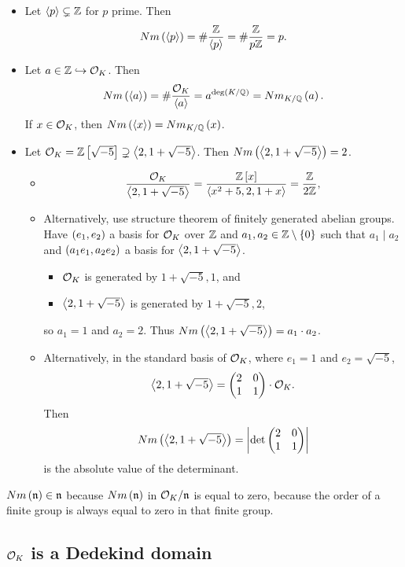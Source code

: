 \begin{example*}
\hfill
\begin{itemize}
\item Let $ \left\langle p \right\rangle \subsetneq \mathbb{Z} $ for $ p $ prime. Then
$$ Nm\left( \left\langle p \right\rangle \right) = \#\dfrac{\mathbb{Z}}{\left\langle p \right\rangle} = \#\dfrac{\mathbb{Z}}{p\mathbb{Z}} = p. $$
\item Let $ a \in \mathbb{Z} \hookrightarrow \mathcal{O}_K $. Then
$$ Nm\left( \left\langle a \right\rangle \right) = \#\dfrac{\mathcal{O}_K}{\left\langle a \right\rangle} = a^{\deg\left( K / \mathbb{Q} \right)} = Nm_{K / \mathbb{Q}}\left( a \right). $$
If $ x \in \mathcal{O}_K $, then $ Nm\left( \left\langle x \right\rangle \right) = Nm_{K / \mathbb{Q}}\left( x \right) $.
\item Let $ \mathcal{O}_K = \mathbb{Z}\left[ \sqrt{-5} \right] \supsetneq \left\langle 2, 1 + \sqrt{-5} \right\rangle $. Then $ Nm\left( \left\langle 2, 1 + \sqrt{-5} \right\rangle \right) = 2 $.
\begin{itemize}
\item
$$ \dfrac{\mathcal{O}_K}{\left\langle 2, 1 + \sqrt{-5} \right\rangle} = \dfrac{\mathbb{Z}\left[ x \right]}{\left\langle x^2 + 5, 2, 1 + x \right\rangle} = \dfrac{\mathbb{Z}}{2\mathbb{Z}}, $$
\item Alternatively, use structure theorem of finitely generated abelian groups. Have $ \left( e_1, e_2 \right) $ a basis for $ \mathcal{O}_K $ over $ \mathbb{Z} $ and $ a_1, a_2 \in \mathbb{Z} \setminus \left\{ 0 \right\} $ such that $ a_1 \mid a_2 $ and $ \left( a_1e_1, a_2e_2 \right) $ a basis for $ \left\langle 2, 1 + \sqrt{-5} \right\rangle $.
\begin{itemize}
\item $ \mathcal{O}_K $ is generated by $ 1 + \sqrt{-5}, 1 $, and
\item $ \left\langle 2, 1 + \sqrt{-5} \right\rangle $ is generated by $ 1 + \sqrt{-5}, 2 $,
\end{itemize}
so $ a_1 = 1 $ and $ a_2 = 2 $. Thus $ Nm\left( \left\langle 2, 1 + \sqrt{-5} \right\rangle \right) = a_1 \cdot a_2 $.
\item Alternatively, in the standard basis of $ \mathcal{O}_K $, where $ e_1 = 1 $ and $ e_2 = \sqrt{-5} $,
$$ \left\langle 2, 1 + \sqrt{-5} \right\rangle = \begin{pmatrix} 2 & 0 \\ 1 & 1 \end{pmatrix} \cdot \mathcal{O}_K. $$
Then
$$ Nm\left( \left\langle 2, 1 + \sqrt{-5} \right\rangle \right) = \left\lvert \det\begin{pmatrix} 2 & 0 \\ 1 & 1 \end{pmatrix} \right\rvert $$
is the absolute value of the determinant.
\end{itemize}
\end{itemize}
\end{example*}


\begin{remark*}
$ Nm\left( \mathfrak{n} \right) \in \mathfrak{n} $ because $ Nm\left( \mathfrak{n} \right) $ in $ \mathcal{O}_K / \mathfrak{n} $ is equal to zero, because the order of a finite group is always equal to zero in that finite group.
\end{remark*}

\subsection{$ \mathcal{O}_K $ is a Dedekind domain}

